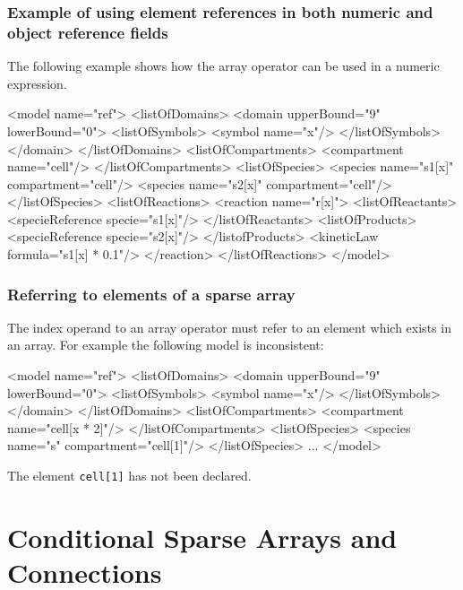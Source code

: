 \documentclass{cekarticle}
\begin{document}
\subsubsection{Example of using element references in both numeric and object reference fields}
The following example shows how the array operator can be used in
a numeric expression.

\begin{example}
<model name="ref">
    <listOfDomains>
        <domain upperBound="9" lowerBound="0">
            <listOfSymbols>
                <symbol name="x"/>
            </listOfSymbols>
        </domain>
    </listOfDomains>
    <listOfCompartments>
        <compartment name="cell"/>
    </listOfCompartments>
    <listOfSpecies>
        <species name="s1[x]" compartment="cell"/>
        <species name="s2[x]" compartment="cell"/>
    </listOfSpecies>
    <listOfReactions>
        <reaction name="r[x]">
            <listOfReactants>
                <specieReference specie="s1[x]"/>
            </listOfReactants>
            <listOfProducts>
                <specieReference specie="s2[x]"/>
            </listofProducts>
            <kineticLaw formula="s1[x] * 0.1"/>
        </reaction>
    </listOfReactions>
</model>
\end{example}

\subsubsection{Referring to elements of a sparse array}

The index operand to an array operator must refer to an element
which exists in an array.  For example the following model is
inconsistent:

\begin{example}
<model name="ref">
    <listOfDomains>
        <domain upperBound="9" lowerBound="0">
            <listOfSymbols>
                <symbol name="x"/>
            </listOfSymbols>
        </domain>
    </listOfDomains>
    <listOfCompartments>
        <compartment name="cell[x * 2]"/>
    </listOfCompartments>
    <listOfSpecies>
        <species name="s" compartment="cell[1]"/>
    </listOfSpecies>
    ...
</model>
\end{example}

The element \texttt{cell[1]} has not been declared.

\section{Conditional Sparse Arrays and Connections}
\end{document}
